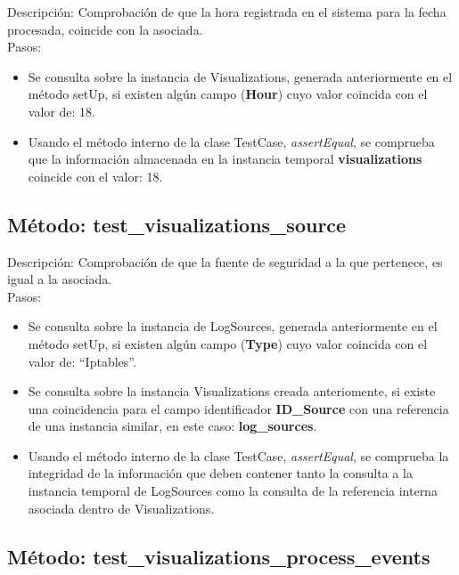 Descripción: Comprobación de que la hora registrada en el sistema para la fecha procesada, coincide con la asociada.\\
Pasos:
\begin{itemize}
\item Se consulta sobre la instancia de Visualizations, generada anteriormente en el método setUp, si existen algún campo (\textbf{Hour}) cuyo valor coincida con el valor de: 18.
\item Usando el método interno de la clase TestCase, \emph{assertEqual}, se comprueba que la información almacenada en la instancia temporal \textbf{visualizations} coincide con el valor: 18.
\end{itemize}



\subsection{\quad Método: test\_visualizations\_source}

Descripción: Comprobación de que la fuente de seguridad a la que pertenece, es igual a la asociada.\\
Pasos:
\begin{itemize}
\item Se consulta sobre la instancia de LogSources, generada anteriormente en el método setUp, si existen algún campo (\textbf{Type}) cuyo valor coincida con el valor de: ``Iptables''.
\item Se consulta sobre la instancia Visualizations creada anteriomente, si existe una coincidencia para el campo identificador \textbf{ID\_Source} con una referencia de una instancia similar, en este caso: \textbf{log\_sources}.
\item Usando el método interno de la clase TestCase, \emph{assertEqual}, se comprueba la integridad de la información que deben contener tanto la consulta a la instancia temporal de LogSources como la consulta de la referencia interna asociada dentro de Visualizations.
\end{itemize}



\subsection{\quad Método: test\_visualizations\_process\_events}

